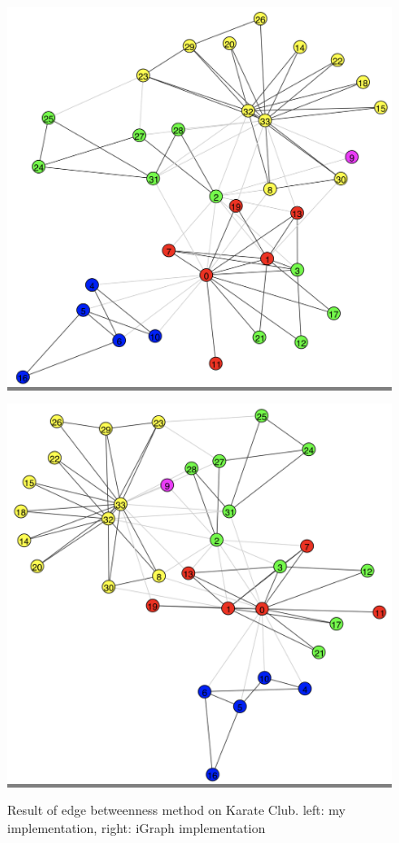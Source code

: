 \documentclass{article}
\begin{document}
\begin{figure}[h]
    \begin{minipage}{0.48\textwidth}
    \colorbox{gray}{\includegraphics[width=\linewidth]{./images/eb-j.png}}
    \end{minipage}
    \hspace{\fill}
    \begin{minipage}{0.48\textwidth}
    \colorbox{gray}{\includegraphics[width=\linewidth]{./images/eb-i.png}}
    \end{minipage}

    \caption{Result of edge betweenness method on Karate Club. left: my implementation, right: iGraph implementation}
    \label{eb}
\end{figure}
\end{document}
